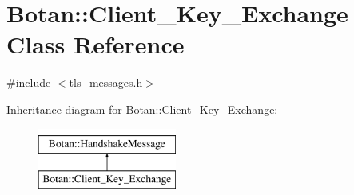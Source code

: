 \hypertarget{classBotan_1_1Client__Key__Exchange}{\section{Botan\-:\-:Client\-\_\-\-Key\-\_\-\-Exchange Class Reference}
\label{classBotan_1_1Client__Key__Exchange}
}


{\ttfamily \#include $<$tls\-\_\-messages.\-h$>$}

Inheritance diagram for Botan\-:\-:Client\-\_\-\-Key\-\_\-\-Exchange\-:\begin{figure}[H]
\begin{center}
\leavevmode
\includegraphics[height=2.000000cm]{classBotan_1_1Client__Key__Exchange}
\end{center}
\end{figure}
